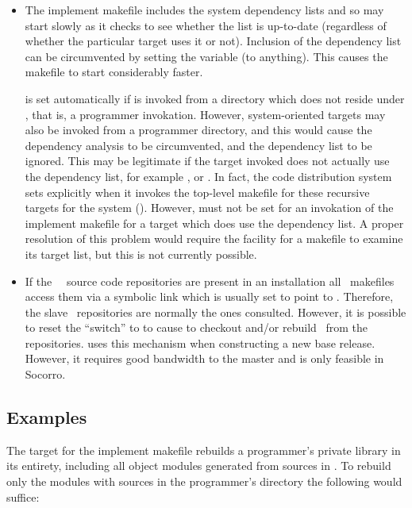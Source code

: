 \begin{itemize}
\item
   The implement makefile includes the system dependency lists and so may
   start slowly as it checks to see whether the list is up-to-date (regardless
   of whether the particular target uses it or not).  Inclusion of the
   dependency list can be circumvented by setting the  variable
   (to anything).  This causes the makefile to start considerably faster.

    is set automatically if  is invoked from a
   directory which does not reside under , that is, a
   programmer invokation.  However, system-oriented targets may also be
   invoked from a programmer directory, and this would cause the dependency
   analysis to be circumvented, and the dependency list to be ignored.  This
   may be legitimate if the target invoked does not actually use the
   dependency list, for example ,  or
   .  In fact, the code distribution system sets 
   explicitly when it invokes the top-level makefile for these recursive
   targets for the system ().  However,  must not
   be set for an invokation of the implement makefile for a target which does
   use the dependency list.  A proper resolution of this problem would require
   the facility for a makefile to examine its target list, but this is not
   currently possible.

\item
   If the \aipspp\ \rcs\ source code repositories are present in an
   installation all \aipspp\ makefiles access them via a symbolic link
    which is usually set to point to .
   Therefore, the slave \rcs\ repositories are normally the ones consulted.
   However, it is possible to reset the  ``switch'' to 
   to cause  to checkout and/or rebuild \aipspp\ from the
    repositories.   uses this mechanism when
   constructing a new base release.  However, it requires good bandwidth to
   the master and is only feasible in Socorro.
\end{itemize}

\subsection*{Examples}

The  target for the implement makefile rebuilds a programmer's
private library in its entirety, including all object modules generated from
sources in .  To rebuild only the modules with sources in the
programmer's directory the following would suffice:

